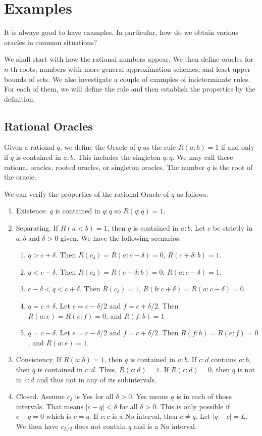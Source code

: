 \documentclass[12pt]{article}
\begin{document}
\section{Examples}

It is always good to have examples. In particular, how do we obtain various oracles in common situations? 

We shall start with how the rational numbers appear. We then define oracles for $n$-th roots,  numbers with more general approximation schemes, and least upper bounds of sets. We also investigate a couple of examples of indeterminate rules. For each of them, we will define the rule and then establish the properties by the definition. 

\subsection{Rational Oracles}\label{sec:rat-ora}

Given a rational $q$, we define the Oracle of $q$ as the rule $R(a:b) = 1$ if and only if $q$ is contained in $a:b$. This includes the singleton $q:q$.  We may call these rational oracles, rooted oracles, or singleton oracles. The number $q$ is the root of the oracle. 

We can verify the properties of the rational Oracle of $q$ as follows: 

\begin{enumerate}
    
    \item Existence. $q$ is contained in $q:q$ so $R(q:q)=1$.
    \item Separating. If $R(a \lt b) =1$, then $q$ is contained in $a : b$. Let $c$ be strictly in $a:b$ and $\delta > 0 $ given. We have the following scenarios: 
    \begin{enumerate}
    \item $q> c + \delta$. Then $R(c_\delta) = R(a:c-\delta) = 0$, $R(c+\delta:b)  = 1$.
    \item $q < c- \delta$. Then $R(c_\delta) = R(c+\delta:b) = 0$, $R(a:c-\delta)  = 1$.
    \item $c-\delta < q < c + \delta$. Then $R(c_\delta)=1$, $R(b:c+\delta) = R(a:c-\delta) = 0$.
    \item $q = c+\delta$. Let $e= c-\delta/2$ and $f=c+\delta/2$. Then $R(a:e)=R(e:f) = 0$, and $R(f:b) = 1$
    \item $q = c-\delta$.  Let $e= c-\delta/2$ and $f=c+\delta/2$. Then $R(f:b)=R(e:f) = 0$, and $R(a:e) = 1$.
    \end{enumerate}    
    \item Consistency. If $R(a:b)=1$, then $q$ is contained in $a:b$. If $c:d$ contains $a:b$, then $q$ is contained in $c:d$. Thus, $R(c:d)=1$. If $R(c:d) = 0$, then $q$ is not in $c:d$ and thus not  in any of its subintervals. 
    \item Closed. Assume $c_\delta$ is Yes for all  $\delta > 0$. Yes means $q$ is in each of those intervals. That means $|c-q|<\delta$ for all $\delta > 0$. This is only possible if $c-q = 0$ which is $c=q$. If $c:c$ is a No interval, then $c \neq q$. Let $|q-c| = L$. We then have $c_{L/2}$ does not contain $q$ and is a No interval. 
\end{enumerate}
\end{document}
